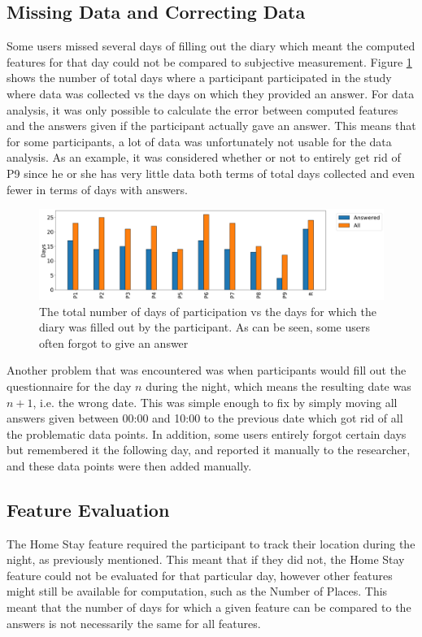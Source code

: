 \subsection{Missing Data and Correcting Data}
Some users missed several days of filling out the diary which meant the computed features for that day could not be compared to subjective measurement. Figure \ref{fig:plot-days-answered} shows the number of total days where a participant participated in the study where data was collected vs the days on which they provided an answer. For data analysis, it was only possible to calculate the error between computed features and the answers given if the participant actually gave an answer. This means that for some participants, a lot of data was unfortunately not usable for the data analysis. As an example, it was considered whether or not to entirely get rid of P9 since he or she has very little data both terms of total days collected and even fewer in terms of days with answers. 
\begin{figure}
    \centering
    \includegraphics[width=\textwidth]{images/study/storage/answers_days_plot.png}
    \caption{The total number of days of participation vs the days for which the diary was filled out by the participant. As can be seen, some users often forgot to give an answer}
    \label{fig:plot-days-answered}
\end{figure}

Another problem that was encountered was when participants would fill out the questionnaire for the day $n$ during the night, which means the resulting date was $n+1$, i.e. the wrong date. This was simple enough to fix by simply moving all answers given between 00:00 and 10:00 to the previous date which got rid of all the problematic data points. In addition, some users entirely forgot certain days but remembered it the following day, and reported it manually to the researcher, and these data points were then added manually. 

\subsection{Feature Evaluation}
The Home Stay feature required the participant to track their location during the night, as previously mentioned. This meant that if they did not, the Home Stay feature could not be evaluated for that particular day, however other features might still be available for computation, such as the Number of Places. This meant that the number of days for which a given feature can be compared to the answers is not necessarily the same for all features. 

